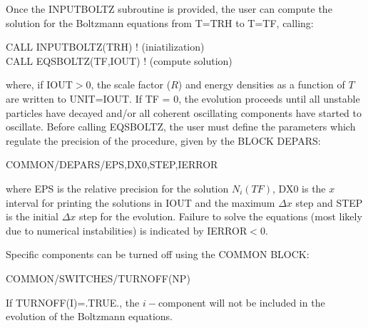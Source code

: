 \documentclass[preprint,notoc]{JHEP3}
\begin{document}
Once the INPUTBOLTZ subroutine is provided, the user can compute the solution for the Boltzmann equations from T=TRH to T=TF,
calling:
\begin{flushleft}
CALL INPUTBOLTZ(TRH)    ! (iniatilization)\\
CALL EQSBOLTZ(TF,IOUT)  ! (compute solution)
\end{flushleft}
where, if IOUT$>0$, the scale factor ($R$) and energy densities as a function of $T$ are written to UNIT=IOUT. If TF = 0,
the evolution proceeds until all unstable particles have decayed and/or all coherent oscillating components have 
started to oscillate. Before calling EQSBOLTZ, the user must define the parameters which regulate the precision
of the procedure, given by the BLOCK DEPARS:
\begin{center}
COMMON/DEPARS/EPS,DX0,STEP,IERROR
\end{center}
where EPS is the relative precision for the solution $N_i(TF)$, DX0 is the $x$ interval for printing the solutions in IOUT and
the maximum $\Delta x$ step and STEP is the initial $\Delta x$ step for the evolution.
Failure to solve the equations (most likely due to numerical instabilities) is indicated by IERROR$<0$.

Specific components can be turned off using the COMMON BLOCK:
\begin{center}
COMMON/SWITCHES/TURNOFF(NP)
\end{center}
If TURNOFF(I)=.TRUE., the $i-$component will not be included in the evolution of the Boltzmann equations.
\end{document}
